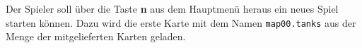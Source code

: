 Der Spieler soll \"uber die Taste \textbf{n} aus dem Hauptmenü heraus ein neues Spiel 
starten k\"onnen. Dazu wird die erste Karte mit dem Namen \texttt{map00.tanks} aus der Menge der mitgelieferten Karten geladen.
